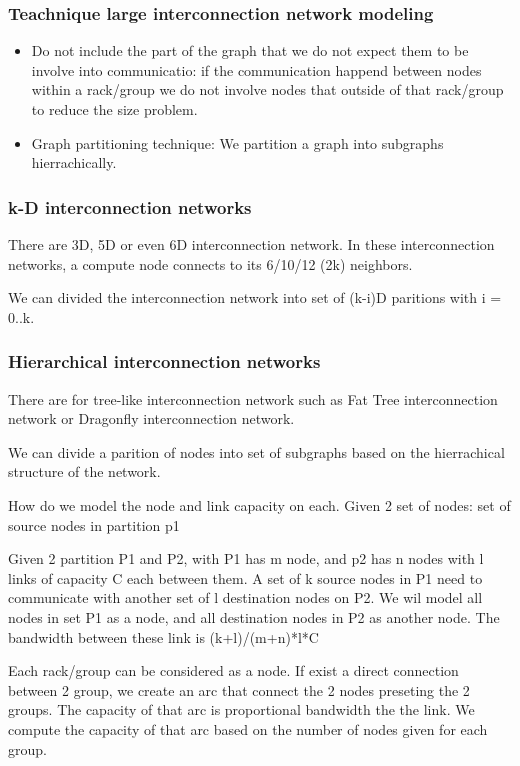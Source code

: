 \documentclass[letter]{article}
\begin{document}
\subsubsection{Teachnique large interconnection network  modeling}
\begin{itemize}
\item Do not include the part of the graph that we do not expect them to be involve into communicatio: if the communication happend between nodes within a rack/group we do not involve nodes that outside of that rack/group to reduce the size problem.
\item Graph partitioning technique: We partition a graph into subgraphs hierrachically.
\end{itemize}

\subsubsection{k-D interconnection networks}
There are 3D, 5D or even 6D interconnection network. In these interconnection networks, a compute node connects to its 6/10/12 (2k) neighbors. %

We can divided the interconnection network into set of (k-i)D paritions with i = 0..k.

\subsubsection{Hierarchical interconnection networks}
There are for tree-like interconnection network such as Fat Tree interconnection network or Dragonfly interconnection network. 

We can divide a parition of nodes into set of subgraphs based on the hierrachical structure of the network.

How do we model the node and link capacity on each. Given 2 set of nodes: set of source nodes in partition p1

Given 2 partition P1 and P2, with P1 has m node, and p2 has n nodes with l links of capacity C each between them. A set of k source nodes in P1 need to communicate with another set of l destination nodes on P2. We wil model all nodes in set P1 as a node, and all destination nodes in P2 as another node. The bandwidth between these link is (k+l)/(m+n)*l*C

Each rack/group can be considered as a node. If exist a direct connection between 2 group, we create an arc that connect the 2 nodes preseting the 2 groups. The capacity of that arc is proportional bandwidth the the link. We compute the capacity of that arc based on the number of nodes given for each group.
\end{document}
